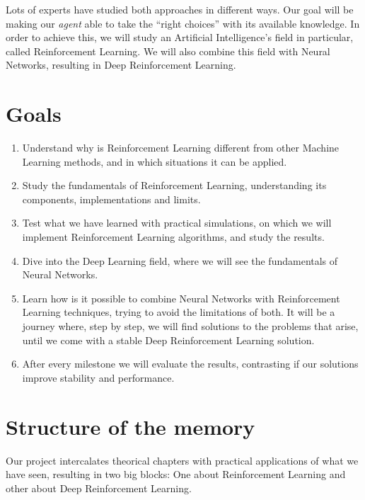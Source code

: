 Lots of experts have studied both approaches in different ways. Our goal will be making our \textit{agent} able to take the ``right choices'' with its available knowledge. In order to achieve this, we will study an Artificial Intelligence's field in particular, called Reinforcement Learning. We will also combine this field with Neural Networks, resulting in Deep Reinforcement Learning.


\section{Goals}

\begin{enumerate}
    \item Understand why is Reinforcement Learning different from other Machine Learning methods, and in which situations it can be applied.
    \item Study the fundamentals of Reinforcement Learning, understanding its components, implementations and limits.
    \item Test what we have learned with practical simulations, on which we will implement Reinforcement Learning algorithms, and study the results.
    \item Dive into the Deep Learning field, where we will see the fundamentals of Neural Networks.
    \item Learn how is it possible to combine Neural Networks with Reinforcement Learning techniques, trying to avoid the limitations of both. It will be a journey where, step by step, we will find solutions to the problems that arise, until we come with a stable Deep Reinforcement Learning solution.
    \item After every milestone we will evaluate the results, contrasting if our solutions improve stability and performance.
\end{enumerate}


\section{Structure of the memory}

Our project intercalates theorical chapters with practical applications of what we have seen, resulting in two big blocks: One about Reinforcement Learning and other about Deep Reinforcement Learning.

